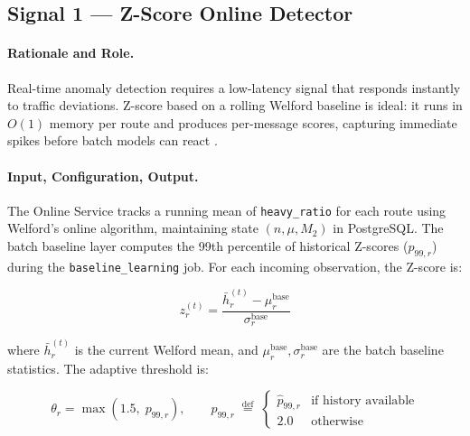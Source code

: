   \subsection{Signal 1 — Z-Score Online Detector}
  \label{subsec:zscore}                                                                                                                                   
                                                                                                                                                          
  \paragraph{Rationale and Role.}
  Real-time anomaly detection requires a low-latency signal that responds instantly to traffic deviations. Z-score based on a rolling Welford baseline is ideal: it runs in $O(1)$ memory per route and produces per-message scores, capturing immediate spikes before batch models can react \cite{welford1962note, finch2009incremental}.

  \paragraph{Input, Configuration, Output.}
  The Online Service tracks a running mean of \texttt{heavy\_ratio} for each route using Welford's online algorithm, maintaining state $(n, \mu, M_2)$ in PostgreSQL. The batch baseline layer computes the 99th percentile of historical Z-scores ($p_{99,r}$) during the \texttt{baseline\_learning} job. For each incoming observation, the Z-score is:

  \begin{equation}
  \label{eq:zscore}
  z_r^{(t)} = \frac{\bar{h}_r^{(t)} - \mu_r^{\text{base}}}{\sigma_r^{\text{base}}}
  \end{equation}

  where $\bar{h}_r^{(t)}$ is the current Welford mean, and $\mu_r^{\text{base}}, \sigma_r^{\text{base}}$ are the batch baseline statistics. The adaptive threshold is:

  \begin{equation}
  \label{eq:threshold_rule}
  \theta_r = \max\!\left(1.5,\; p_{99,r}\right), \qquad p_{99,r} \;\overset{\text{def}}{=}\; \begin{cases} \hat{p}_{99,r} & \text{if history available} \\ 2.0 & \text{otherwise} \end{cases}
  \end{equation}

